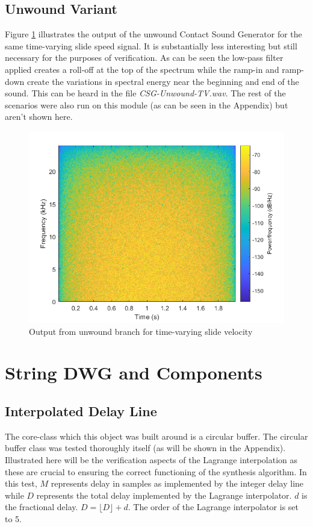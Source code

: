 \documentclass[../main.tex]{subfiles}
\begin{document}
\subsection{Unwound Variant}
Figure \ref{fig:CSGUnwoundTVSpec} illustrates the output of the unwound Contact Sound Generator for the same time-varying slide speed signal. It is substantially less interesting but still necessary for the purposes of verification. As can be seen the low-pass filter applied creates a roll-off at the top of the spectrum while the ramp-in and ramp-down create the variations in spectral energy near the beginning and end of the sound. This can be heard in the file \emph{CSG-Unwound-TV.wav}. The rest of the scenarios were also run on this module (as can be seen in the Appendix) but aren't shown here.

\begin{figure}[h]
    \centering
    \includegraphics[scale=.65]{./images/plots/CSG_Unwound_TV.png}
    \caption{Output from unwound branch for time-varying slide velocity}
    \label{fig:CSGUnwoundTVSpec}
\end{figure}

\section{String DWG and Components}

\subsection{Interpolated Delay Line}
The core-class which this object was built around is a circular buffer. The circular buffer class was tested thoroughly itself (as will be shown in the Appendix). Illustrated here will be the verification aspects of the Lagrange interpolation as these are crucial to ensuring the correct functioning of the synthesis algorithm. In this test, $M$ represents delay in samples as implemented by the integer delay line while $D$ represents the total delay implemented by the Lagrange interpolator. $d$ is the fractional delay. $D = \lfloor D \rfloor + d$. The order of the Lagrange interpolator is set to 5.
\end{document}
